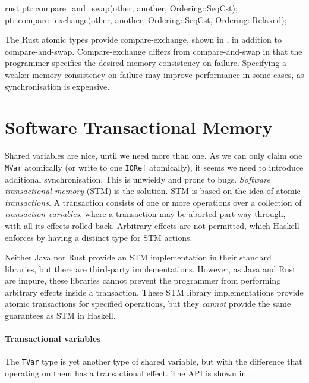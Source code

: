 \begin{listing}
\centering
\begin{cminted}{rust}
ptr.compare_and_swap(other, another, Ordering::SeqCst);
ptr.compare_exchange(other, another, Ordering::SeqCst, Ordering::Relaxed);
\end{cminted}
\caption{Compare-and-swap in Rust.}\label{lst:cas_rust}
\end{listing}

The Rust atomic types provide compare-exchange, shown in
, in addition to compare-and-swap.
Compare-exchange differs from compare-and-swap in that the programmer
specifies the desired memory consistency on failure.  Specifying a
weaker memory consistency on failure may improve performance in some
cases, as synchronisation is expensive.

\section{Software Transactional Memory}
\label{sec:concurrent_haskell-stm}

Shared variables are nice, until we need more than one.  As we can
only claim one \verb|MVar| atomically (or write to one \verb|IORef|
atomically), it seems we need to introduce additional synchronisation.
This is unwieldy and prone to bugs.  \emph{Software transactional
  memory} (STM)\cite{harris2005,shavit1995} is the solution.  STM is
based on the idea of atomic \emph{transactions}.  A transaction
consists of one or more operations over a collection of
\emph{transaction variables}, where a transaction may be aborted
part-way through, with all its effects rolled back.  Arbitrary effects
are not permitted, which Haskell enforces by having a distinct type
for STM actions.

Neither Java nor Rust provide an STM implementation in their standard
libraries, but there are third-party implementations.  However, as
Java and Rust are impure, these libraries cannot prevent the
programmer from performing arbitrary effects inside a transaction.
These STM library implementations provide atomic transactions for
specified operations, but they \emph{cannot} provide the same
guarantees as STM in Haskell.

\paragraph{Transactional variables}
The \verb|TVar| type is yet another type of shared variable, but with
the difference that operating on them has a transactional effect.  The
API is shown in .

